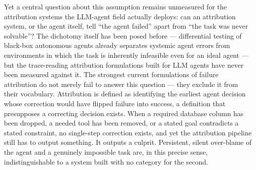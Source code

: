 \documentclass[11pt]{article}
\begin{document}
Yet a central question about this assumption remains unmeasured for the attribution systems the LLM-agent field actually deploys: can an attribution system, or the agent itself, tell ``the agent failed'' apart from ``the task was never solvable''? The dichotomy itself has been posed before --- differential testing of black-box autonomous agents already separates systemic agent errors from environments in which the task is inherently infeasible even for an ideal agent \citep{AIProbe3870} --- but the trace-reading attribution formulations built for LLM agents have never been measured against it. The strongest current formulations of failure attribution do not merely fail to answer this question --- they exclude it from their vocabulary. Attribution is defined as identifying the earliest agent decision whose correction would have flipped failure into success, a definition that presupposes a correcting decision exists. When a required database column has been dropped, a needed tool has been removed, or a stated goal contradicts a stated constraint, no single-step correction exists, and yet the attribution pipeline still has to output something. It outputs a culprit. Persistent, silent over-blame of the agent and a genuinely impossible task are, in this precise sense, indistinguishable to a system built with no category for the second.
\end{document}

